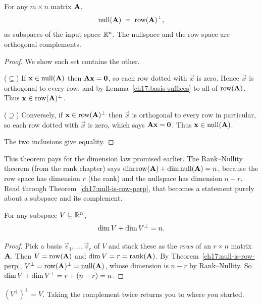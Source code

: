 \begin{theorem}\label{ch17:null-is-row-perp}
For any $m\times n$ matrix $\mathbf{A}$,
\[
  \operatorname{null}(\mathbf{A}) \;=\; \operatorname{row}(\mathbf{A})^{\perp},
\]
as subspaces of the input space $\mathbb{R}^n$. The nullspace and the row space are orthogonal
complements.
\end{theorem}

\begin{proof}
We show each set contains the other.

($\subseteq$) If $\mathbf{x}\in\operatorname{null}(\mathbf{A})$ then $\mathbf{A}\mathbf{x}=\mathbf{0}$, so each row dotted
with $\vec{x}$ is zero. Hence $\vec{x}$ is orthogonal to every row, and by
Lemma~\ref{ch17:basis-suffices} to all of $\operatorname{row}(\mathbf{A})$. Thus $\mathbf{x}\in\operatorname{row}(\mathbf{A})^\perp$.

($\supseteq$) Conversely, if $\mathbf{x}\in\operatorname{row}(\mathbf{A})^\perp$ then $\vec{x}$ is orthogonal to every
row in particular, so each row dotted with $\vec{x}$ is zero, which says $\mathbf{A}\mathbf{x}=\mathbf{0}$.
Thus $\mathbf{x}\in\operatorname{null}(\mathbf{A})$.

The two inclusions give equality.
\end{proof}

This theorem pays for the dimension law promised earlier. The Rank--Nullity theorem (from the
rank chapter) says $\operatorname{dim}\operatorname{row}(\mathbf{A})+\operatorname{dim}\operatorname{null}(\mathbf{A})=n$, because the row space has dimension
$r$ (the rank) and the nullspace has dimension $n-r$. Read through Theorem~\ref{ch17:null-is-row-perp},
that becomes a statement purely about a subspace and its complement.

\begin{theorem}\label{ch17:dim-complement}
For any subspace $V\subseteq\mathbb{R}^n$,
\[
  \operatorname{dim} V + \operatorname{dim} V^{\perp} = n.
\]
\end{theorem}

\begin{proof}
Pick a basis $\vec{v}_1,\dots,\vec{v}_r$ of $V$ and stack these as the \emph{rows} of an
$r\times n$ matrix $\mathbf{A}$. Then $V=\operatorname{row}(\mathbf{A})$ and $\operatorname{dim} V=r=\operatorname{rank}(\mathbf{A})$. By
Theorem~\ref{ch17:null-is-row-perp}, $V^\perp=\operatorname{row}(\mathbf{A})^\perp=\operatorname{null}(\mathbf{A})$, whose dimension
is $n-r$ by Rank--Nullity. So $\operatorname{dim} V+\operatorname{dim} V^\perp = r+(n-r)=n$.
\end{proof}

\begin{corollary}\label{ch17:perp-perp}
$(V^\perp)^\perp = V$. Taking the complement twice returns you to where you started.
\end{corollary}


